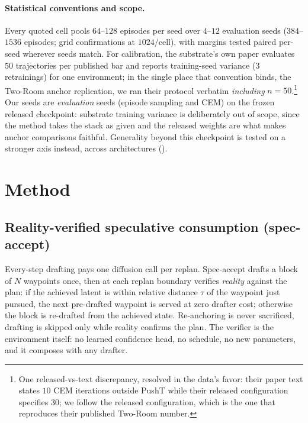 \documentclass{article}
\begin{document}
\paragraph{Statistical conventions and scope.} Every quoted cell pools $64$--$128$
episodes per seed over $4$--$12$ evaluation seeds ($384$--$1536$ episodes; grid
confirmations at $1024$/cell), with margins tested paired per-seed wherever seeds
match. For calibration, the substrate's own paper \citep{lewm} evaluates $50$
trajectories per published bar and reports training-seed variance ($3$ retrainings)
for one environment; in the single place that convention binds, the Two-Room anchor
replication, we ran their protocol verbatim \emph{including} $n{=}50$.\footnote{One
released-vs-text discrepancy, resolved in the data's favor: their paper text states
$10$ CEM iterations outside PushT while their released configuration specifies $30$;
we follow the released configuration, which is the one that reproduces their
published Two-Room number.} Our seeds are \emph{evaluation} seeds (episode sampling
and CEM) on the frozen released checkpoint: substrate training variance is
deliberately out of scope, since the method takes the stack as given and the
released weights are what makes anchor comparisons faithful. Generality beyond this
checkpoint is tested on a stronger axis instead, across architectures
().

\section{Method}
\label{sec:method}

\subsection{Reality-verified speculative consumption (spec-accept)}
\label{sec:method-spec}
Every-step drafting pays one diffusion call per replan. Spec-accept drafts a block of
$N$ waypoints once, then at each replan boundary verifies \emph{reality} against the
plan: if the achieved latent is within relative distance $\tau$ of the waypoint just
pursued, the next pre-drafted waypoint is served at zero drafter cost; otherwise the
block is re-drafted from the achieved state. Re-anchoring is never sacrificed, drafting is skipped only while reality confirms the plan. The verifier is the
environment itself: no learned confidence head, no schedule, no new parameters, and it
composes with any drafter.
\end{document}
